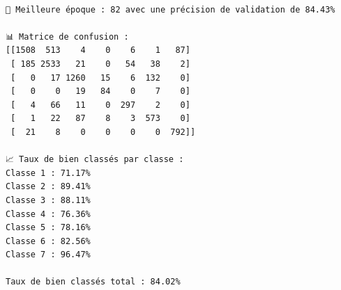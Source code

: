 \documentclass[
  letterpaper,
  DIV=11,
  numbers=noendperiod]{scrartcl}
\begin{document}
\begin{verbatim}

🔹 Meilleure époque : 82 avec une précision de validation de 84.43%

📊 Matrice de confusion :
[[1508  513    4    0    6    1   87]
 [ 185 2533   21    0   54   38    2]
 [   0   17 1260   15    6  132    0]
 [   0    0   19   84    0    7    0]
 [   4   66   11    0  297    2    0]
 [   1   22   87    8    3  573    0]
 [  21    8    0    0    0    0  792]]

📈 Taux de bien classés par classe :
Classe 1 : 71.17%
Classe 2 : 89.41%
Classe 3 : 88.11%
Classe 4 : 76.36%
Classe 5 : 78.16%
Classe 6 : 82.56%
Classe 7 : 96.47%

Taux de bien classés total : 84.02%
\end{verbatim}
\end{document}
